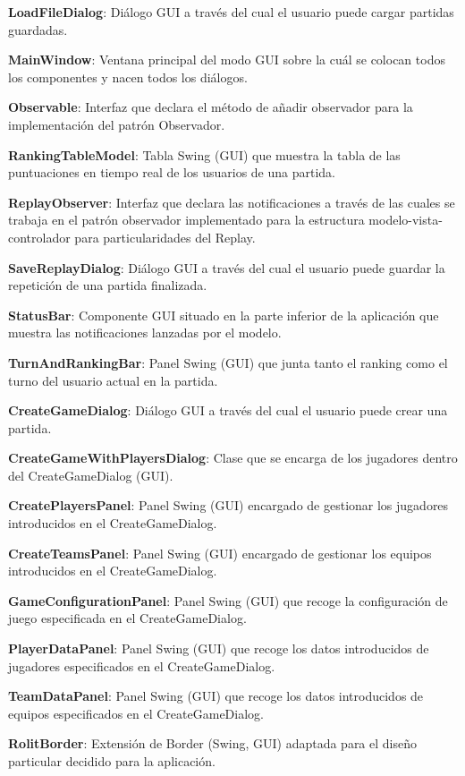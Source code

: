 \documentclass[12pt,a4paper,openright]{book}
\theoremstyle{break}
\begin{document}
\textbf{LoadFileDialog}: Diálogo GUI a través del cual el usuario puede cargar partidas guardadas.

\textbf{MainWindow}: Ventana principal del modo GUI sobre la cuál se colocan todos los componentes y nacen todos los diálogos.

\textbf{Observable}: Interfaz que declara el método de añadir observador para la implementación del patrón Observador.

\textbf{RankingTableModel}: Tabla Swing (GUI) que muestra la tabla de las puntuaciones en tiempo real de los usuarios de una partida.

\textbf{ReplayObserver}: Interfaz que declara las notificaciones a través de las cuales se trabaja en el patrón observador implementado para la estructura modelo-vista-controlador para particularidades del Replay.

\textbf{SaveReplayDialog}: Diálogo GUI a través del cual el usuario puede guardar la repetición de una partida finalizada.

\textbf{StatusBar}: Componente GUI situado en la parte inferior de la aplicación que muestra las notificaciones lanzadas por el modelo.

\textbf{TurnAndRankingBar}: Panel Swing (GUI) que junta tanto el ranking como el turno del usuario actual en la partida.

\textbf{CreateGameDialog}: Diálogo GUI a través del cual el usuario puede crear una partida.

\textbf{CreateGameWithPlayersDialog}: Clase que se encarga de los jugadores dentro del CreateGameDialog (GUI).

\textbf{CreatePlayersPanel}: Panel Swing (GUI) encargado de gestionar los jugadores introducidos en el CreateGameDialog.

\textbf{CreateTeamsPanel}: Panel Swing (GUI) encargado de gestionar los equipos introducidos en el CreateGameDialog.

\textbf{GameConfigurationPanel}: Panel Swing (GUI) que recoge la configuración de juego especificada en el CreateGameDialog.

\textbf{PlayerDataPanel}: Panel Swing (GUI) que recoge los datos introducidos de jugadores especificados en el CreateGameDialog.

\textbf{TeamDataPanel}: Panel Swing (GUI) que recoge los datos introducidos de equipos especificados en el CreateGameDialog.

\textbf{RolitBorder}: Extensión de Border (Swing, GUI) adaptada para el diseño particular decidido para la aplicación.
\end{document}
